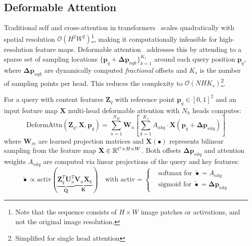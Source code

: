 \subsection{Deformable Attention}
\label{sec:deformable_attention}

Traditional self and cross-attention in transformers~\cite{vaswani2023attention} scales quadratically with spatial resolution \( \mathcal{O}(H^2W^2) \)\footnote{Note that the sequence consists of \(H \times W\) image patches or activations, and not the original image resolution.}, making it computationally infeasible for high-resolution feature maps. Deformable attention~\cite{zhu2021deformabledetr} addresses this by attending to a sparse set of sampling locations \(\{\mathbf{p}_q + \boldsymbol{\Delta p}_{nqk}\}_{k=1}^{K_s}\) around each query position \(\mathbf{p}_q\), where \(\boldsymbol{\Delta p}_{nqk}\) are dynamically computed \emph{fractional} offsets and \(K_s\) is the number of sampling points per head. This reduces the complexity to \(\mathcal{O}(NHK_s)\)\footnote{Simplified for single head attention}.

For a query with content features \(\mathbf{Z}_q\) with reference point \(\mathbf{p}_q \in [0, 1]^2\) and an input feature map \( \mathbf{X} \) multi-head deformable attention with \( N_h \) heads computes:
\begin{equation}
  \label{eq:deformable_attention_general}
  \text{DeformAttn}(\mathbf{Z}_q, \mathbf{X}, \mathbf{p}_q) = \sum_{n=1}^{N_{H}} \mathbf{W}_n \left[ \sum_{k=1}^{K_s} A_{nkq} \cdot \mathbf{X}(\mathbf{p}_q + \boldsymbol{\Delta p}_{nkq}) \right]
\end{equation}
where \(\mathbf{W}_m\) are learned projection matrices and \(\mathbf{X}(\bullet)\) represents bilinear sampling from the feature map \( \mathbf{X} \in \mathbb{R}^{C \times H \times W} \). Both offsets \(\boldsymbol{\Delta p}_{nkq}\) and attention weights \(A_{nkq}\) are computed via linear projections of the query and key features:
\begin{equation}
\label{eq:deformable_attention_offsets}
\tilde{\bullet} \propto \text{activ}(\underbrace{\mathbf{Z}^T_q \mathbf{U}_n^T}_{\mathbf{Q}}\underbrace{\mathbf{V}_n \mathbf{X}_k}_{\mathbf{K}}) \quad \text{with activ} = \begin{cases}
 &\text{softmax} \text{ for }\tilde{\bullet} = A_{nkq} \\
 &\text{sigmoid} \text{ for }\tilde{\bullet} = \boldsymbol{\Delta p}_{nkq}
\end{cases}
\end{equation}

